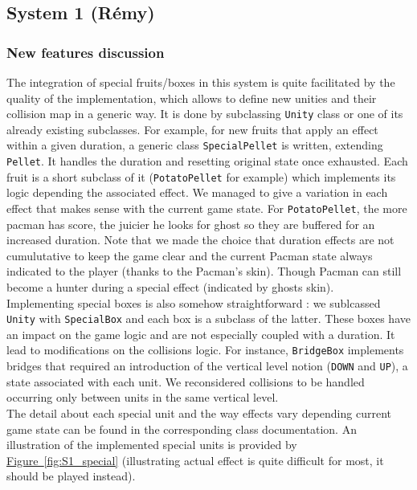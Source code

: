 \documentclass[]{article}
\newcommand{\wordlink}[2]{\hyperref[#2]{#1~\ref{#2}}}
\begin{document}
\subsection{System 1 (Rémy)}

\subsubsection{New features discussion}

\indent\par The integration of special fruits/boxes in this system is quite facilitated by the quality of the implementation, which allows to define new unities and their collision map in a generic way. It is done by subclassing \texttt{Unity} class or one of its already existing subclasses. For example, for new fruits that apply an effect within a given duration, a generic class \texttt{SpecialPellet} is written, extending \texttt{Pellet}. It handles the duration and resetting original state once exhausted. Each fruit is a short subclass of it (\texttt{PotatoPellet} for example) which implements its logic depending the associated effect. We managed to give a variation in each effect that makes sense with the current game state. For \texttt{PotatoPellet}, the more pacman has score, the juicier he looks for ghost so they are buffered for an increased duration. Note that we made the choice that duration effects are not cumulutative to keep the game clear and the current Pacman state always indicated to the player (thanks to the Pacman's skin). Though Pacman can still become a hunter during a special effect (indicated by ghosts skin).\\

Implementing special boxes is also somehow straightforward : we sublcassed \texttt{Unity} with \texttt{SpecialBox} and each box is a subclass of the latter. These boxes have an impact on the game logic and are not especially coupled with a duration. It lead to modifications on the collisions logic. For instance, \texttt{BridgeBox} implements bridges that required an introduction of the vertical level notion (\texttt{DOWN} and \texttt{UP}), a state associated with each unit. We reconsidered collisions to be handled occurring only between units in the same vertical level.\\

The detail about each special unit and the way effects vary depending current game state can be found in the corresponding class documentation. An illustration of the implemented special units is provided by \wordlink{Figure}{fig:S1_special} (illustrating actual effect is quite difficult for most, it should be played instead).\\
\end{document}
